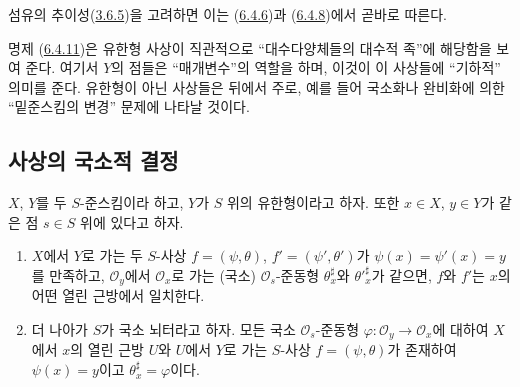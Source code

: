 섬유의 추이성(\hyperref[I.3.6.5-ko]{3.6.5})을 고려하면 이는
(\hyperref[I.6.4.6-ko]{6.4.6})과 (\hyperref[I.6.4.8-ko]{6.4.8})에서
곧바로 따른다.

\begin{env}[6.4.13]
\label{I.6.4.13-ko}
명제 (\hyperref[I.6.4.11-ko]{6.4.11})은 유한형 사상이 직관적으로
``대수다양체들의 대수적 족''에 해당함을 보여 준다. 여기서 $Y$의 점들은
``매개변수''의 역할을 하며, 이것이 이 사상들에 ``기하적'' 의미를 준다.
유한형이 아닌 사상들은 뒤에서 주로, 예를 들어 국소화나 완비화에 의한
``밑준스킴의 변경'' 문제에 나타날 것이다.
\end{env}

\subsection{사상의 국소적 결정}
\label{subsection:I.6.5-ko}

\begin{proposition}[6.5.1]
\label{I.6.5.1-ko}
$X$, $Y$를 두 $S$-준스킴이라 하고, $Y$가 $S$ 위의 유한형이라고 하자.
또한 $x\in X$, $y\in Y$가 같은 점 $s\in S$ 위에 있다고 하자.
\begin{enumerate}
  \item[\rm(i)] $X$에서 $Y$로 가는 두 $S$-사상
    $f=(\psi,\theta)$, $f'=(\psi',\theta')$가
    $\psi(x)=\psi'(x)=y$를 만족하고, $\mathscr{O}_y$에서
    $\mathscr{O}_x$로 가는 (국소) $\mathscr{O}_s$-준동형
    $\theta_x^\sharp$와 ${\theta'}_x^\sharp$가 같으면, $f$와 $f'$는
    $x$의 어떤 열린 근방에서 일치한다.
  \item[\rm(ii)] 더 나아가 $S$가 국소 뇌터라고 하자. 모든 국소
    $\mathscr{O}_s$-준동형
    $\varphi:\mathscr{O}_y\to\mathscr{O}_x$에 대하여 $X$에서 $x$의
    열린 근방 $U$와 $U$에서 $Y$로 가는 $S$-사상
    $f=(\psi,\theta)$가 존재하여
    $\psi(x)=y$이고 $\theta_x^\sharp=\varphi$이다.
\end{enumerate}
\end{proposition}

